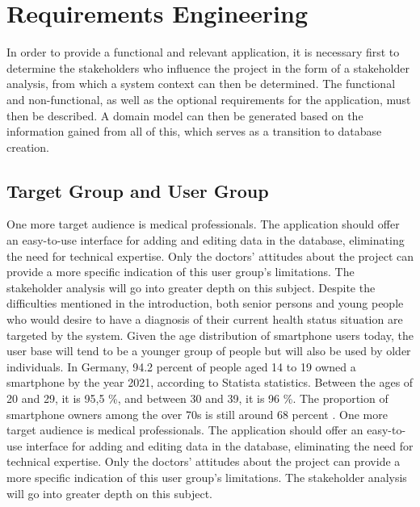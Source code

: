 
\chapter{Requirements Engineering}
In order to provide a functional and relevant application, it is necessary first to determine the stakeholders who influence the project in the form of a stakeholder analysis, from which a system context can then be determined. The functional and non-functional, as well as the optional requirements for the application, must then be described. A domain model can then be generated based on the information gained from all of this, which serves as a transition to database creation.

\section{Target Group and User Group}
One more target audience is medical professionals. The application should offer an easy-to-use interface for adding and editing data in the database, eliminating the need for technical expertise. Only the doctors' attitudes about the project can provide a more specific indication of this user group's limitations. The stakeholder analysis will go into greater depth on this subject. Despite the difficulties mentioned in the introduction, both senior persons and young people who would desire to have a diagnosis of their current health status situation are targeted by the system. Given the age distribution of smartphone users today, the user base will tend to be a younger group of people but will also be used by older individuals. In Germany, 94.2 percent of people aged 14 to 19 owned a smartphone by the year 2021, according to Statista statistics. Between the ages of 20 and 29, it is 95,5 \%, and between 30 and 39, it is 96 \%. The proportion of smartphone owners among the over 70s is still around 68 percent \cite{.smartphonenutzer}.
One more target audience is medical professionals. The application should offer an easy-to-use interface for adding and editing data in the database, eliminating the need for technical expertise. Only the doctors' attitudes about the project can provide a more specific indication of this user group's limitations. The stakeholder analysis will go into greater depth on this subject. 

